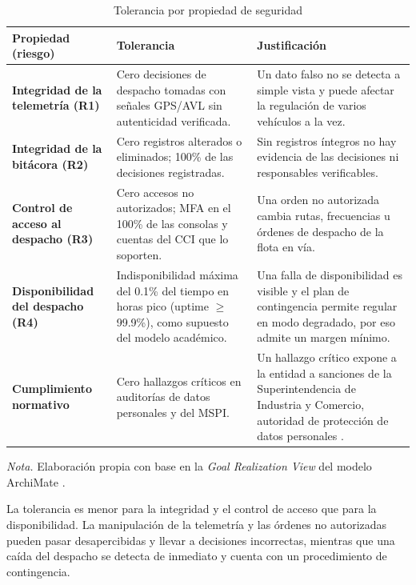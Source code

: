 \begin{table}[H]
	\caption{Tolerancia por propiedad de seguridad}
	\label{tab:tolerancia}
	\centering
	\footnotesize
	\renewcommand{\arraystretch}{1.15}
	\begin{tabularx}{\textwidth}{@{}>{\raggedright\arraybackslash}p{} Y Y@{}}
		\toprule
		\textbf{Propiedad (riesgo)} & \textbf{Tolerancia} & \textbf{Justificación} \\
		\midrule
		\textbf{Integridad de la telemetría (R1)}
		& Cero decisiones de despacho tomadas con señales GPS/AVL sin autenticidad verificada.
		& Un dato falso no se detecta a simple vista y puede afectar la regulación de varios vehículos a la vez.
		\\
		\midrule
		\textbf{Integridad de la bitácora (R2)}
		& Cero registros alterados o eliminados; 100\% de las decisiones registradas.
		& Sin registros íntegros no hay evidencia de las decisiones ni responsables verificables.
		\\
		\midrule
		\textbf{Control de acceso al despacho (R3)}
		& Cero accesos no autorizados; MFA en el 100\% de las consolas y cuentas del CCI que lo soporten.
		& Una orden no autorizada cambia rutas, frecuencias u órdenes de despacho de la flota en vía.
		\\
		\midrule
		\textbf{Disponibilidad del despacho (R4)}
		& Indisponibilidad máxima del 0.1\% del tiempo en horas pico (uptime $\geq$ 99.9\%), como supuesto del modelo académico.
		& Una falla de disponibilidad es visible y el plan de contingencia permite regular en modo degradado, por eso admite un margen mínimo.
		\\
		\midrule
		\textbf{Cumplimiento normativo}
		& Cero hallazgos críticos en auditorías de datos personales y del MSPI.
		& Un hallazgo crítico expone a la entidad a sanciones de la Superintendencia de Industria y Comercio, autoridad de protección de datos personales \parencite{ley1581de2012}.
		\\
		\bottomrule
	\end{tabularx}

	\vspace{0.4em}
	\parbox{\textwidth}{\footnotesize \textit{Nota.} Elaboración propia con base en la \textit{Goal Realization View} del modelo ArchiMate \parencite{modeloArchimateCCI2026}.}
\end{table}

La tolerancia es menor para la integridad y el control de acceso que para la disponibilidad. La manipulación de la telemetría y las órdenes no autorizadas pueden pasar desapercibidas y llevar a decisiones incorrectas, mientras que una caída del despacho se detecta de inmediato y cuenta con un procedimiento de contingencia.

